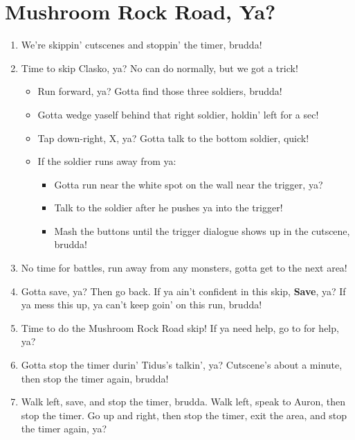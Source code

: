 \chapter{Mushroom Rock Road, Ya?}

\begin{enumerate}
\item We're skippin' cutscenes and stoppin' the timer, brudda!
\item Time to skip Clasko, ya? No can do normally, but we got a trick!
\begin{itemize}
\item Run forward, ya? Gotta find those three soldiers, brudda!
\item Gotta wedge yaself behind that right soldier, holdin' left for a sec!
\item Tap down-right, X, ya? Gotta talk to the bottom soldier, quick!
\item If the soldier runs away from ya:
\begin{itemize}
\item Gotta run near the white spot on the wall near the trigger, ya?
\item Talk to the soldier after he pushes ya into the trigger!
\item Mash the buttons until the trigger dialogue shows up in the cutscene, brudda!
\end{itemize}
\end{itemize}
\item No time for battles, run away from any monsters, gotta get to the next area!
\item Gotta save, ya? Then go back. If ya ain't confident in this skip, \textbf{Save}, ya? If ya mess this up, ya can't keep goin' on this run, brudda!
\item Time to do the Mushroom Rock Road skip! If ya need help, go to  for help, ya?
\item Gotta stop the timer durin' Tidus's talkin', ya? Cutscene's about a minute, then stop the timer again, brudda!
\item Walk left, save, and stop the timer, brudda. Walk left, speak to Auron, then stop the timer. Go up and right, then stop the timer, exit the area, and stop the timer again, ya?
\end{enumerate}